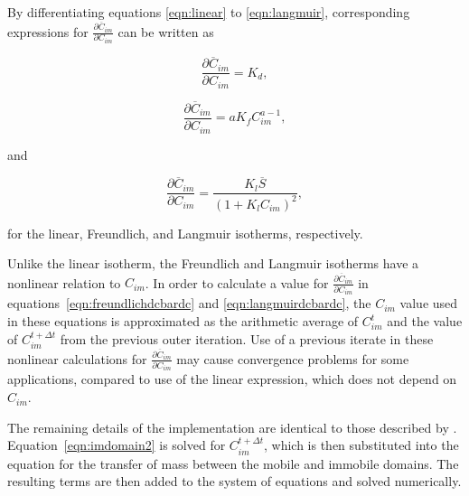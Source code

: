 By differentiating equations \ref{eqn:linear} to \ref{eqn:langmuir}, corresponding expressions for $\frac{\partial \overline{C}_{im}}{\partial C_{im}}$ can be written as

\begin{equation}
\label{eqn:lineardcbardc}
\frac{\partial \overline{C}_{im}}{\partial C_{im}} = K_d,
\end{equation}

\begin{equation}
\label{eqn:freundlichdcbardc}
\frac{\partial \overline{C}_{im}}{\partial C_{im}} = a K_f C_{im}^{a - 1},
\end{equation}

\noindent and

\begin{equation}
\label{eqn:langmuirdcbardc}
\frac{\partial \overline{C}_{im}}{\partial C_{im}} = \frac{K_l \overline{S}}{\left ( 1 + K_l C_{im} \right )^2},
\end{equation}

\noindent for the linear, Freundlich, and Langmuir isotherms, respectively.  

Unlike the linear isotherm, the Freundlich and Langmuir isotherms have a nonlinear relation to $C_{im}$.  In order to calculate a value for $\frac{\partial \overline{C}_{im}}{\partial C_{im}}$ in equations~\ref{eqn:freundlichdcbardc} and \ref{eqn:langmuirdcbardc}, the $C_{im}$ value used in these equations is approximated as the arithmetic average of $C_{im}^{t}$ and the value of $C_{im}^{t + \Delta t}$ from the previous outer iteration.  Use of a previous iterate in these nonlinear calculations for $\frac{\partial \overline{C}_{im}}{\partial C_{im}}$ may cause convergence problems for some applications, compared to use of the linear expression, which does not depend on $C_{im}$.

The remaining details of the implementation are identical to those described by \cite{modflow6gwt}.  Equation~\ref{eqn:imdomain2} is solved for $C_{im}^{t + \Delta t}$, which is then substituted into the equation for the transfer of mass between the mobile and immobile domains.  The resulting terms are then added to the system of equations and solved numerically.